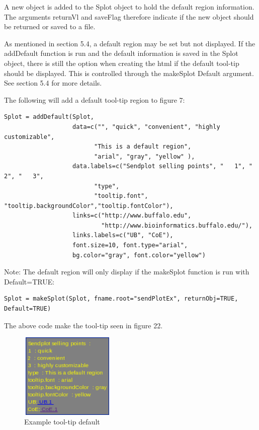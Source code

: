 \documentclass[]{article}
\begin{document}
\indent A new object is added to the Splot object to hold the default region information. The arguments returnVl and saveFlag therefore indicate if the new object should be returned or saved to a file. \newline

\indent As mentioned in section 5.4, a default region may be set but not displayed. If the addDefault function is run and the default information is saved in the Splot object, there is still the option when creating the html if the default tool-tip should be displayed. This is controlled through the makeSplot Default argument. See section 5.4 for more details. \newline

\indent The following will add a default tool-tip region to figure 7: 





\begin{verbatim}
Splot = addDefault(Splot, 
                   data=c("", "quick", "convenient", "highly customizable", 
                         "This is a default region",
                         "arial", "gray", "yellow" ), 
                   data.labels=c("Sendplot selling points", "   1", "   2", "   3", 
                         "type",
                         "tooltip.font", "tooltip.backgroundColor","tooltip.fontColor"),                    
                   links=c("http://www.buffalo.edu", 
                           "http://www.bioinformatics.buffalo.edu/"), 
                   links.labels=c("UB", "CoE"),
                   font.size=10, font.type="arial",
                   bg.color="gray", font.color="yellow")
\end{verbatim}


Note: The default region will only display if the makeSplot function is run with Default=TRUE:


\begin{verbatim}
Splot = makeSplot(Splot, fname.root="sendPlotEx", returnObj=TRUE, Default=TRUE)
\end{verbatim}

The above code make the tool-tip seen in figure 22.

\begin{center}
\begin{figure}
\includegraphics[width=1.8in, height=1.6in]{DefaultToolTip}
\caption{Example tool-tip default}
\end{figure}
\end{center}
\end{document}
